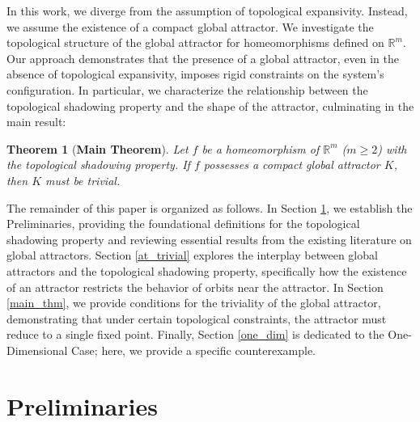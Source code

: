 \documentclass{amsart}
\newtheorem{teo}{Theorem}
\newcommand{\R}{{\mathbb{R}}}
\begin{document}
In this work, we diverge from the assumption of topological expansivity. Instead, we assume the existence of a compact global attractor. %
We investigate the topological structure of the global attractor for homeomorphisms defined on $\R^m$. %
Our approach demonstrates that the presence of a global attractor, even in the absence of topological expansivity, imposes rigid constraints on the system's configuration. In particular, we characterize the relationship between the topological shadowing property and the shape of the attractor, culminating in the main result:

\begin{teo}[\bf Main Theorem]\label{K_trivial}   Let $f$ be a homeomorphism of $\R^m$ ($m\geq 2$) with the topological shadowing property. If $f$ possesses a compact global attractor $K$, then $K$ must be trivial.
\end{teo}


The remainder of this paper is organized as follows. In Section \ref{prel}, we establish the Preliminaries, providing the foundational definitions for the topological shadowing property and reviewing essential results from the existing literature on global attractors. Section \ref{at_trivial} explores the interplay between global attractors and the topological shadowing property, specifically how the existence of an attractor restricts  the behavior of orbits near the attractor.
In Section \ref{main_thm}, we provide conditions for the triviality of the global attractor, demonstrating that under certain topological constraints, the attractor must reduce to a single fixed point. Finally, Section \ref{one_dim}  is dedicated to the One-Dimensional Case; here, we provide a specific counterexample.


\section{Preliminaries}\label{prel}
	
\end{document}
